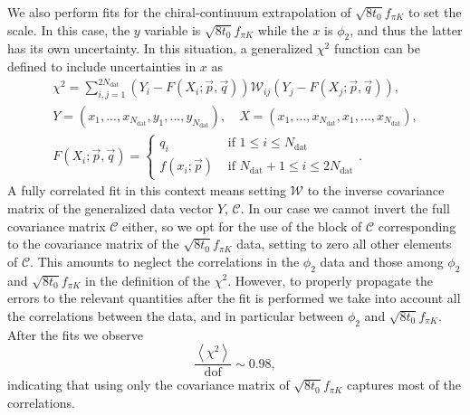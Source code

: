 We also perform fits for the chiral-continuum extrapolation of $\sqrt{8t_0}f_{\pi K}$ to set the scale. In this case, the $y$ variable is $\sqrt{8t_0}f_{\pi K}$ while the $x$ is $\phi_2$, and thus the latter has its own uncertainty. In this situation, a generalized $\chi^2$ function can be defined to include uncertainties in $x$ as
\begin{gather}
\label{apex_chisq:eq:chisq_generalized}
\chi^2=\sum_{i,j=1}^{2N_{\textrm{dat}}}\left(Y_i-F(X_i;\vec{p},\vec{q})\right)\mathcal{W}_{ij}\left(Y_j-F(X_j;\vec{p},\vec{q})\right), \\
Y=(x_1,...,x_{N_{\textrm{dat}}},y_1,...,y_{N_{\textrm{dat}}}), \quad
X=(x_1,...,x_{N_{\textrm{dat}}},x_1,...,x_{N_{\textrm{dat}}}), \\
F(X_i;\vec{p},\vec{q})=\left\{\begin{matrix}
q_i & \textrm{ if $1\leq i\leq N_{\textrm{dat}}$} \\ 
f(x_i;\vec{p}) & \textrm{ if $N_{\textrm{dat}}+1\leq i\leq 2N_{\textrm{dat}}$}
\end{matrix}\right..
\end{gather}
A fully correlated fit in this context means setting $\mathcal{W}$ to the inverse covariance matrix of the generalized data vector $Y$, $\mathcal{C}$. In our case we cannot invert the full covariance matrix $\mathcal{C}$ either, so we opt for the use of the block of $\mathcal{C}$ corresponding to the covariance matrix of the $\sqrt{8t_0}f_{\pi K}$ data, setting to zero all other elements of $\mathcal{C}$. This amounts to neglect the correlations in the $\phi_2$ data and those among $\phi_2$ and $\sqrt{8t_0}f_{\pi K}$ in the definition of the $\chi^2$. However, to properly propagate the errors to the relevant quantities after the fit is performed we take into account all the correlations between the data, and in particular between $\phi_2$ and $\sqrt{8t_0}f_{\pi K}$. After the fits we observe
\begin{equation}
\frac{\left<\chi^2\right>}{{\textrm{dof}}}\sim0.98,
\end{equation}
indicating that using only the covariance matrix of $\sqrt{8t_0}f_{\pi K}$ captures most of the correlations.



